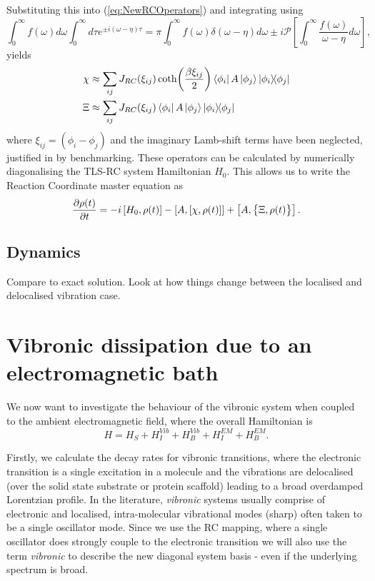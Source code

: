 \documentclass[]{article}
\begin{document}
Substituting this into (\ref{eq:NewRCOperators}) and integrating using 
\begin{equation}
	\label{eq:Sokhotski}
	\int_{0}^{\infty}f(\omega)d\omega\int_{0}^{\infty}d\tau e^{\pm i(\omega-\eta)\tau} = \pi\int_{0}^{\infty}f(\omega)\delta(\omega-\eta)d\omega \pm i \mathcal{P}\left[\int_{0}^{\infty}\frac{f(\omega)}{\omega-\eta}d\omega\right],
\end{equation}
yields
\begin{align}
	\label{eq:NewRCOperatorsDiscrete}
	\chi &\approx \sum_{ij}J_{RC}(\xi_{ij}) \coth(\frac{\beta \xi_{ij}}{2})\bra{\phi_i}A\ket{\phi_j}\dyad{\phi_i}{\phi_j}\\
	\Xi &\approx \sum_{ij}J_{RC}(\xi_{ij}) \bra{\phi_i}A\ket{\phi_j}\dyad{\phi_i}{\phi_j}
\end{align}
where $\xi_{ij} = (\phi_i-\phi_j)$ and the imaginary Lamb-shift terms have been neglected, justified in by benchmarking. These operators can be calculated by numerically diagonalising the TLS-RC system Hamiltonian $H_0$. This allows us to write the Reaction Coordinate master equation as
\begin{equation}
\pdv{\rho(t)}{t} = -i\left[H_0, \rho(t)\right] - \left[A, \left[\chi, \rho(t)\right]\right] + \left[A, \big\lbrace\Xi, \rho(t)\big\rbrace\right].
\end{equation}

\subsection{Dynamics}
Compare to exact solution. Look at how things change between the localised and delocalised vibration case.
\section{Vibronic dissipation due to an electromagnetic bath}
We now want to investigate the behaviour of the vibronic system when coupled to the ambient electromagnetic field, where the overall Hamiltonian is
\begin{equation}
H = H_S + H_I^{Vib} + H_B^{Vib} + H_I^{EM}+ H_B^{EM}.
\end{equation}

Firstly, we calculate the decay rates for vibronic transitions, where the electronic transition is a single excitation in a molecule and the vibrations are delocalised (over the solid state substrate or protein scaffold) leading to a broad overdamped Lorentzian profile. In the literature, \textit{vibronic} systems usually comprise of electronic and localised, intra-molecular vibrational modes (sharp) often taken to be a single oscillator mode. Since we use the RC mapping, where a single oscillator does strongly couple to the electronic transition we will also use the term \textit{vibronic} to describe the new diagonal system basis - even if the underlying spectrum is broad.
\end{document}
